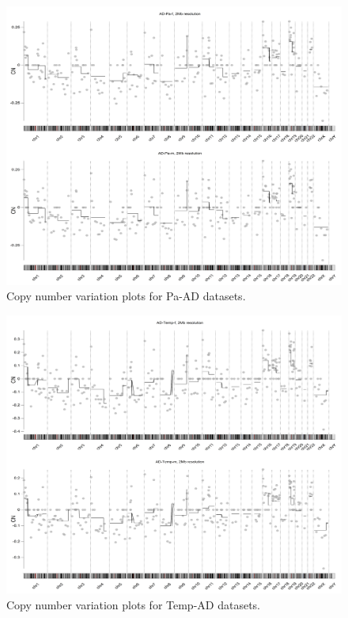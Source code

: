 \begin{figure}[!ht] 
    \centerline{\includegraphics[width = 13cm]{Figures/CNV/cnv3.jpg}}
\caption{Copy number variation plots for Pa-AD datasets.}
\label{fig:cnv-pa}
\end{figure}

\begin{figure}[!ht] 
    \centerline{\includegraphics[width = 13cm]{Figures/CNV/cnv4.jpg}}
\caption{Copy number variation plots for Temp-AD datasets.}
\label{fig:cnv-temp}
\end{figure}

